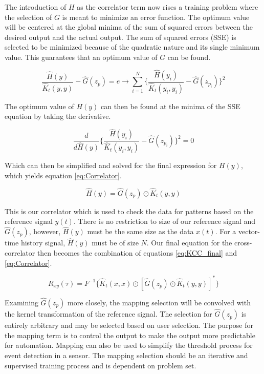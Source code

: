     The introduction of $H$ as the correlator term now rises a training problem where the selection of $G$ is meant to minimize an error function. The optimum value will be centered at the global minima of the sum of squared errors between the desired output and the actual output. The sum of squared errors (SSE) is selected to be minimized because of the quadratic nature and its single minimum value. This guarantees that an optimum value of $G$ can be found.

    \[
        \frac{\hat{H}(y)}{\hat{K}_t(y,y)} - \hat{G}(z_p) = e \rightarrow \sum_{i = 1}^N 
        \{ \frac{\hat{H}(y_i)}{\hat{K}_t(y_i,y_i)} - \hat{G}(z_{p_i}) \}^2
    \]

    The optimum value of $H(y)$ can then be found at the minima of the SSE equation by taking the derivative. 

    \[
        \frac{d}{d \hat{H}(y)} \{ \frac{\hat{H}(y_i)}{\hat{K}_t(y_i,y_i)} - \hat{G}(z_{p_i}) \}^2 = 0
    \]

    Which can then be simplified and solved for the final expression for $H(y)$, which yields equation \ref*{eq:Correlator}.

    \begin{equation} \label{eq:Correlator}
        \hat{H}(y) = \hat{G}(z_p) \odot \hat{K}_t(y,y)
    \end{equation}

    This is our correlator which is used to check the data for patterns based on the reference signal $y(t)$. There is no restriction to size of our reference signal and $\hat{G}(z_p)$, however, $\hat{H}(y)$ must be the same size as the data $x(t)$. For a vector-time history signal, $\hat{H}(y)$ must be of size $N$. Our final equation for the cross-correlator then becomes the combination of equations \ref*{eq:KCC_final} and \ref*{eq:Correlator}.

    \begin{equation} \label{eq:Correlator}
        {R}_{xy}(\tau) = F^{-1}\{ \hat{K}_t(x, x) \odot  [\hat{G}(z_p) \odot \hat{K}_t(y,y)]^*\}
    \end{equation}

    Examining $\hat{G}(z_p)$ more closely, the mapping selection will be convolved with the kernel transformation of the reference signal. The selection for $\hat{G}(z_p)$ is entirely arbitrary and may be selected based on user selection. The purpose for the mapping term is to control the output to make the output more predictable for automation. Mapping can also be used to simplify the threshold process for event detection in a sensor. The mapping selection should be an iterative and supervised training process and is dependent on problem set.
    
